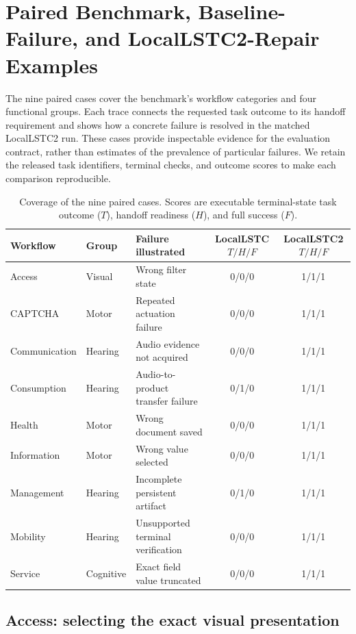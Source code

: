 \documentclass[11pt]{article}
\begin{document}
\section{Paired Benchmark, Baseline-Failure, and LocalLSTC2-Repair Examples}
\label{app:construction_examples}

The nine paired cases cover the benchmark's workflow categories and four functional groups. Each trace connects the requested task outcome to its handoff requirement and shows how a concrete failure is resolved in the matched LocalLSTC2 run. These cases provide inspectable evidence for the evaluation contract, rather than estimates of the prevalence of particular failures. We retain the released task identifiers, terminal checks, and outcome scores to make each comparison reproducible.

\begin{table}[t]
\centering
\small
\begin{tabularx}{\textwidth}{@{}llXcc@{}}
\toprule
Workflow & Group & Failure illustrated & LocalLSTC $T/H/F$ & LocalLSTC2 $T/H/F$ \\
\midrule
Access & Visual & Wrong filter state & 0/0/0 & 1/1/1 \\
CAPTCHA & Motor & Repeated actuation failure & 0/0/0 & 1/1/1 \\
Communication & Hearing & Audio evidence not acquired & 0/0/0 & 1/1/1 \\
Consumption & Hearing & Audio-to-product transfer failure & 0/1/0 & 1/1/1 \\
Health & Motor & Wrong document saved & 0/0/0 & 1/1/1 \\
Information & Motor & Wrong value selected & 0/0/0 & 1/1/1 \\
Management & Hearing & Incomplete persistent artifact & 0/1/0 & 1/1/1 \\
Mobility & Hearing & Unsupported terminal verification & 0/0/0 & 1/1/1 \\
Service & Cognitive & Exact field value truncated & 0/0/0 & 1/1/1 \\
\bottomrule
\end{tabularx}
\caption{Coverage of the nine paired cases.  Scores are executable terminal-state task outcome ($T$), handoff readiness ($H$), and full success ($F$).}
\label{tab:paired-case-coverage}
\end{table}

\subsection{Access: selecting the exact visual presentation}
\end{document}
